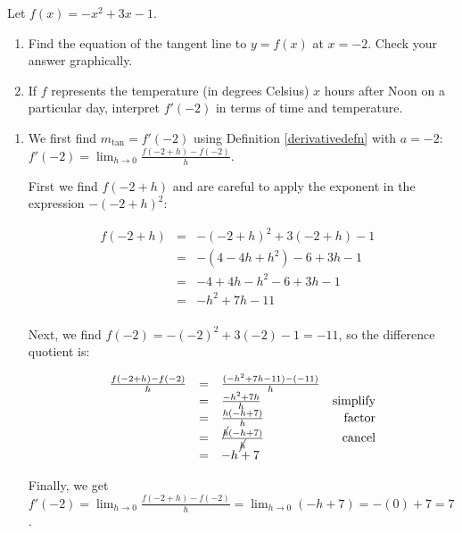 \documentclass{ximera}
\begin{document}
\begin{example}  \label{tangentlineex}  Let $f(x) = -x^2 + 3x-1$.  

\begin{enumerate}

\item Find the equation of the tangent line to $y = f(x)$ at $x = -2$.  Check your answer graphically.

\item  If $f$ represents the temperature (in degrees Celsius) $x$ hours after Noon on a particular day, interpret $f'(-2)$ in terms of time and temperature.

\end{enumerate}



\begin{explanation} \begin{enumerate} \item We first find $m_{\text{tan}} = f'(-2)$ using Definition \ref{derivativedefn} with $a = -2$:  $ f'(-2) = \lim_{h \rightarrow 0}  \frac{f(-2+h) - f(-2)}{h}$. 

First we find $f(-2+h)$ and are  careful to apply the exponent in the expression $-(-2+h)^2$:

\[ \begin{array}{rclr}  
  f(-2+h) & = & -(-2+h)^2 +3(-2+h) -1 & \\ 
  & = & - (4 - 4h+h^2) -6+3h-1 & \\
 & = & -4 + 4h-h^2-6+3h-1& \\
  & = & -h^2+7h-11& \\
 \end{array} \]

Next, we find $f(-2) = -(-2)^2 + 3(-2)-1 = -11$, so the difference quotient is:

\[ \begin{array}{rclr}

 \frac{f(-2+h)-f(-2)}{h} & = &  \frac{(-h^2+7h-11) -(-11)}{h} & \\ 
 & = &  \frac{-h^2+7h}{h} & \text{simplify}\\ 
 & = &   \frac{h(-h+7)}{h} & \text{factor} \\ 
 & = &   \frac{\cancel{h}(-h+7)}{\cancel{h}} &  \text{cancel} \\  & = & -h+7\\ \end{array} \]

Finally, we get $ f'(-2) = \lim_{h \rightarrow 0}  \frac{f(-2+h) - f(-2)}{h} = \lim_{h \rightarrow 0} (-h+7) = -(0) + 7 = 7$.




\end{enumerate}
\end{explanation}
\end{example}
\end{document}
